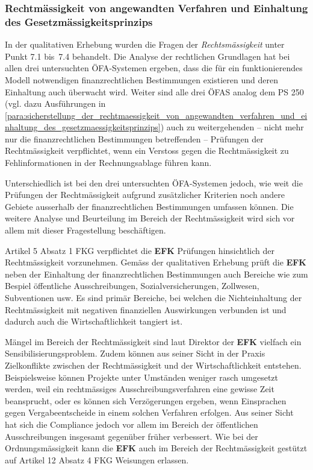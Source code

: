 \documentclass[10pt]{article}
\begin{document}
\subsubsection{Rechtmässigkeit von angewandten Verfahren und Einhaltung des Gesetzmässigkeitsprinzips}\label{subsubsec:rechtmaessigkeit_von_angewandten_verfahren_und_einhaltung_des_gesetzmaessigkeitsprinzips}
In der qualitativen Erhebung wurden die Fragen der \textit{Rechtsmässigkeit} unter Punkt 7.1 bis~7.4 behandelt. Die Analyse der rechtlichen Grundlagen hat bei allen drei untersuchten ÖFA-Systemen ergeben, dass die für ein funktionierendes Modell notwendigen finanzrechtlichen Bestimmungen existieren und deren Einhaltung auch überwacht wird. Weiter sind alle drei ÖFAS analog dem PS 250 (vgl. dazu Ausführungen in \vref{para:sicherstellung_der_rechtmaessigkeit_von_angewandten_verfahren_und_einhaltung_des_gesetzmaessigkeitsprinzips}) auch zu weitergehenden -- nicht mehr nur die finanzrechtlichen Bestimmungen betreffenden -- Prüfungen der Rechtmässigkeit verpflichtet, wenn ein Verstoss gegen die Rechtmässigkeit zu Fehlinformationen in der Rechnungsablage führen kann.

Unterschiedlich ist bei den drei untersuchten ÖFA-Systemen jedoch, wie weit die Prüfungen der Rechtmässigkeit aufgrund zusätzlicher Kriterien noch andere Gebiete ausserhalb der finanzrechtlichen Bestimmungen umfassen können. Die weitere Analyse und Beurteilung im Bereich der Rechtmässigkeit wird sich vor allem mit dieser Fragestellung beschäftigen.

Artikel 5 Absatz 1 FKG verpflichtet die \textbf{EFK} Prüfungen hinsichtlich der Rechtmässigkeit vorzunehmen. Gemäss der qualitativen Erhebung prüft die \textbf{EFK} neben der Einhaltung der finanzrechtlichen Bestimmungen auch Bereiche wie zum Bespiel öffentliche Ausschreibungen, Sozialversicherungen, Zollwesen, Subventionen usw. Es sind primär Bereiche, bei welchen die Nichteinhaltung der Rechtmässigkeit mit negativen finanziellen Auswirkungen verbunden ist und dadurch auch die Wirtschaftlichkeit tangiert ist.

Mängel im Bereich der Rechtmässigkeit sind laut Direktor der \textbf{EFK} vielfach ein Sensibilisierungsproblem. Zudem können aus seiner Sicht in der Praxis Zielkonflikte zwischen der Rechtmässigkeit und der Wirtschaftlichkeit entstehen. Beispielsweise können Projekte unter Umständen weniger rasch umgesetzt werden, weil ein recht­mässiges Ausschreibungsverfahren eine gewisse Zeit beansprucht, oder es können sich Verzögerungen ergeben, wenn Einsprachen gegen Vergabeentscheide in einem solchen Verfahren erfolgen. Aus seiner Sicht hat sich die Compliance jedoch vor allem im Bereich der öffentlichen Ausschreibungen insgesamt gegenüber früher verbessert. Wie bei der Ordnungsmässigkeit kann die \textbf{EFK} auch im Bereich der Rechtmässigkeit gestützt auf Artikel 12 Absatz 4 FKG Weisungen erlassen.
\end{document}
